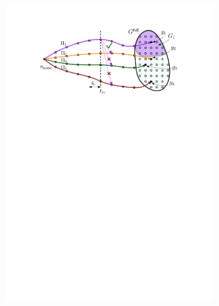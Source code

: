 \documentclass[conference]{IEEEtran}
\begin{document}
\begin{figure}[t]
    \centering
    \begin{subfigure}{.225\textwidth}
        \includegraphics[width=\textwidth]{3_preprocess_loop_1}
        \caption{}
        \label{fig:pl1}
    \end{subfigure}
    \hspace{1mm}
    \begin{subfigure}{0.225\textwidth}

\end{subfigure}
\end{figure}
\end{document}
